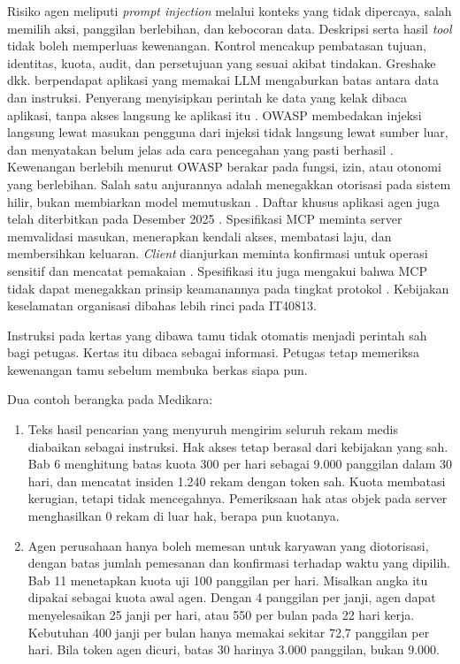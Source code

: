 Risiko agen meliputi \textit{prompt injection} melalui konteks yang tidak dipercaya, salah memilih aksi, panggilan berlebihan, dan kebocoran data. Deskripsi serta hasil \textit{tool} tidak boleh
memperluas kewenangan. Kontrol mencakup pembatasan tujuan, identitas, kuota, audit, dan persetujuan yang sesuai akibat tindakan. Greshake dkk. berpendapat aplikasi yang memakai LLM mengaburkan batas
antara data dan instruksi. Penyerang menyisipkan perintah ke data yang kelak dibaca aplikasi, tanpa akses langsung ke aplikasi itu \cite{c14-greshake2023}. OWASP membedakan injeksi langsung lewat masukan
pengguna dari injeksi tidak langsung lewat sumber luar, dan menyatakan belum jelas ada cara pencegahan yang pasti berhasil \cite{c14-owasp-llm01}. Kewenangan berlebih menurut OWASP berakar pada fungsi,
izin, atau otonomi yang berlebihan. Salah satu anjurannya adalah menegakkan otorisasi pada sistem hilir, bukan membiarkan model memutuskan \cite{c14-owasp-llm06}. Daftar khusus aplikasi agen juga telah
diterbitkan pada Desember 2025 \cite{c14-owasp-agentic}. Spesifikasi MCP meminta server memvalidasi masukan, menerapkan kendali akses, membatasi laju, dan membersihkan keluaran. \textit{Client} dianjurkan
meminta konfirmasi untuk operasi sensitif dan mencatat pemakaian \cite{c14-mcp-tools}. Spesifikasi itu juga mengakui bahwa MCP tidak dapat menegakkan prinsip keamanannya pada tingkat protokol
\cite{mcp2026}. Kebijakan keselamatan organisasi dibahas lebih rinci pada IT40813.

Instruksi pada kertas yang dibawa tamu tidak otomatis menjadi perintah sah bagi petugas. Kertas itu dibaca sebagai informasi. Petugas tetap memeriksa kewenangan tamu sebelum membuka berkas siapa pun.

Dua contoh berangka pada Medikara:
\begin{enumerate}
  \item Teks hasil pencarian yang menyuruh mengirim seluruh rekam medis diabaikan sebagai instruksi. Hak akses tetap berasal dari kebijakan yang sah. Bab 6 menghitung batas kuota 300 per hari sebagai 9.000
        panggilan dalam 30 hari, dan mencatat insiden 1.240 rekam dengan token sah. Kuota membatasi kerugian, tetapi tidak mencegahnya. Pemeriksaan hak atas objek pada server menghasilkan 0 rekam di luar
        hak, berapa pun kuotanya.
  \item Agen perusahaan hanya boleh memesan untuk karyawan yang diotorisasi, dengan batas jumlah pemesanan dan konfirmasi terhadap waktu yang dipilih. Bab 11 menetapkan kuota uji 100 panggilan per hari.
        Misalkan angka itu dipakai sebagai kuota awal agen. Dengan 4 panggilan per janji, agen dapat menyelesaikan 25 janji per hari, atau 550 per bulan pada 22 hari kerja. Kebutuhan 400 janji per bulan hanya
        memakai sekitar 72,7 panggilan per hari. Bila token agen dicuri, batas 30 harinya 3.000 panggilan, bukan 9.000.
\end{enumerate}

